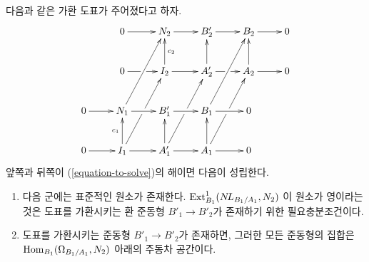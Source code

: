 \begin{lemma}
\label{lemma-huge-diagram}
다음과 같은 가환 도표가 주어졌다고 하자.
$$
\xymatrix{
& 0 \ar[r] & N_2 \ar[r] & B'_2 \ar[r] & B_2 \ar[r] & 0 \\
& 0 \ar[r]|\hole & I_2 \ar[u]_{c_2} \ar[r] &
A'_2 \ar[u] \ar[r]|\hole & A_2 \ar[u] \ar[r] & 0 \\
0 \ar[r] & N_1 \ar[ruu] \ar[r] & B'_1 \ar[r] & B_1 \ar[ruu] \ar[r] & 0 \\
0 \ar[r] & I_1 \ar[ruu]|\hole \ar[u]^{c_1} \ar[r] &
A'_1 \ar[ruu]|\hole \ar[u] \ar[r] & A_1 \ar[ruu]|\hole \ar[u] \ar[r] & 0
}
$$
앞쪽과 뒤쪽이 (\ref{equation-to-solve})의 해이면 다음이 성립한다.
\begin{enumerate}
\item 다음 군에는 표준적인 원소가 존재한다.
$\mathop{\mathrm{Ext}}\nolimits^1_{B_1}(\mathop{N\!L}\nolimits_{B_1/A_1}, N_2)$
이 원소가 영이라는 것은 도표를 가환시키는 환 준동형
$B'_1 \to B'_2$가 존재하기 위한 필요충분조건이다.
\item 도표를 가환시키는 준동형 $B'_1 \to B'_2$가 존재하면,
그러한 모든 준동형의 집합은
$\mathop{\mathrm{Hom}}\nolimits_{B_1}(\Omega_{B_1/A_1}, N_2)$ 아래의 주동차 공간이다.
\end{enumerate}
\end{lemma}

